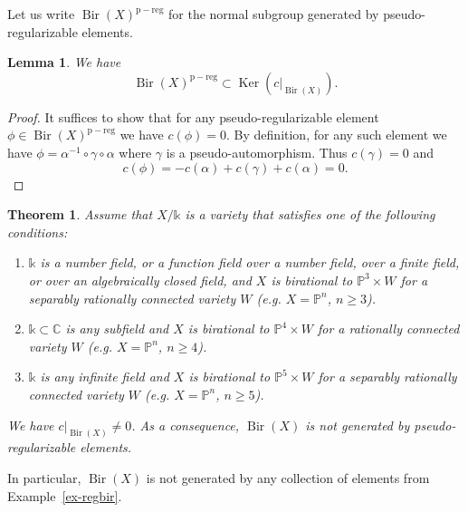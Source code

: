 \documentclass[a4paper,12pt]{amsart}
\def\C{\mathbb C}
\def\k{\mathbb k}
\def\P{\mathbb P}
\def\Ker{{\operatorname{Ker}}}
\def\Bir{{\operatorname{Bir}}}
\theoremstyle{plain}
\newtheorem{theorem}[dummy]{Theorem}
\newtheorem{lemma}[dummy]{Lemma}
\numberwithin{equation}{section}
\theoremstyle{definition}
\newcommand{\psreg}{\mathrm{p-reg}}
\renewcommand{\(}{\left(}
\renewcommand{\)}{\right)}
\begin{document}
Let us write 
$\Bir(X)^{\psreg}$ for the normal subgroup
generated by pseudo-regularizable elements.

\begin{lemma}\label{lem:regularizable}
We have 
\[
\Bir(X)^{\psreg} \subset \Ker(c|_{\Bir(X)}).
\]
\end{lemma}
\begin{proof}
It suffices to show that
for any pseudo-regularizable element
$\phi \in \Bir(X)^{\psreg}$ we have
$c(\phi) = 0$.
By definition, for any such element 
we have $\phi = \alpha^{-1} \circ \gamma \circ \alpha$ where $\gamma$ is a pseudo-automorphism.
Thus $c(\gamma) = 0$ and 
\begin{equation*}
c(\phi) = -{c}(\alpha) + {c}(\gamma) + {c}(\alpha) = 0.
\end{equation*}
\end{proof}


\begin{theorem}\label{thm:bir-generation}
Assume that $X/\k$ is a variety
that
satisfies one of the following conditions:
\begin{enumerate}
    \item[(a)] $\k$ is a number field,
    or a function field over a number field,
    over a finite field, or over an algebraically closed field,
    and $X$ is birational to $\P^3 \times W$ for a
    separably rationally
    connected variety $W$
    (e.g. $X = \P^n$, $n \ge 3$).
    \item[(b)] $\k \subset \C$ is any subfield
    and $X$ is birational to $\P^4 \times W$ for a  rationally
    connected variety $W$
    (e.g. $X = \P^n$, $n \ge 4$).
    \item[(c)] $\k$ is any infinite
    field
    and $X$ is birational to $\P^5 \times W$ for a separably rationally
    connected variety $W$ 
    (e.g. $X = \P^n$, $n \ge 5$).
\end{enumerate}
We have $c|_{\Bir(X)} \ne 0$. 
As a consequence, 
$\Bir(X)$ is not generated by pseudo-regularizable elements. 
\end{theorem}

In particular, $\Bir(X)$ is not generated by 
any collection of elements from Example~\ref{ex-regbir}.
\end{document}

